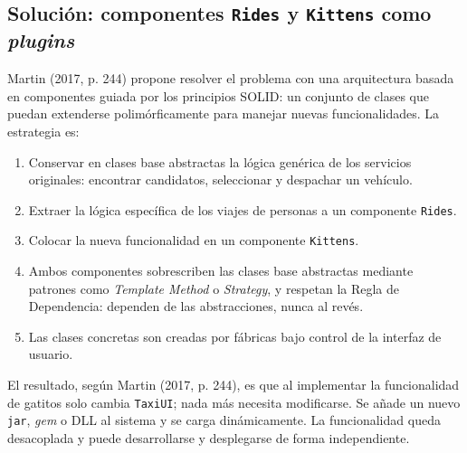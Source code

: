 \documentclass[11pt,a4paper]{article}
\begin{document}
\subsection{Solución: componentes \texttt{Rides} y \texttt{Kittens} como \emph{plugins}}

Martin (2017, p. 244) propone resolver el problema con una arquitectura basada en componentes guiada por los principios SOLID: un conjunto de clases que puedan extenderse polimórficamente para manejar nuevas funcionalidades. La estrategia es:

\begin{enumerate}[leftmargin=1.5em]
  \item Conservar en clases base abstractas la lógica genérica de los servicios originales: encontrar candidatos, seleccionar y despachar un vehículo.
  \item Extraer la lógica específica de los viajes de personas a un componente \texttt{Rides}.
  \item Colocar la nueva funcionalidad en un componente \texttt{Kittens}.
  \item Ambos componentes sobrescriben las clases base abstractas mediante patrones como \emph{Template Method} o \emph{Strategy}, y respetan la Regla de Dependencia: dependen de las abstracciones, nunca al revés.
  \item Las clases concretas son creadas por fábricas bajo control de la interfaz de usuario.
\end{enumerate}

El resultado, según Martin (2017, p. 244), es que al implementar la funcionalidad de gatitos solo cambia \texttt{TaxiUI}; nada más necesita modificarse. Se añade un nuevo \texttt{jar}, \emph{gem} o DLL al sistema y se carga dinámicamente. La funcionalidad queda desacoplada y puede desarrollarse y desplegarse de forma independiente.
\end{document}
